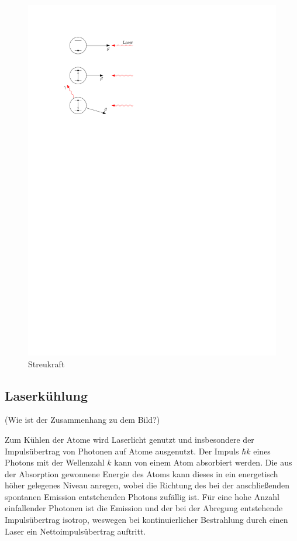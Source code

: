 \documentclass[11pt, a4paper]{article}
\numberwithin{equation}{section}
\newcommand{\korr}[1]{{\color{red}(#1)}}
\begin{document}
\begin{figure}
	\centering
	\includegraphics{./figures/theory/streukraft.pdf}
	\caption{Streukraft}
\end{figure}

\subsection{Laserkühlung}
\korr{Wie ist der Zusammenhang zu dem Bild?}

Zum Kühlen der Atome wird Laserlicht genutzt und insbesondere der Impulsübertrag von Photonen auf Atome ausgenutzt.
Der Impuls $\hbar k$ eines Photons mit der Wellenzahl $k$ kann von einem Atom absorbiert werden.
Die aus der Absorption gewonnene Energie des Atoms kann dieses in ein energetisch höher gelegenes Niveau anregen, wobei die Richtung des bei der anschließenden spontanen Emission entstehenden Photons zufällig ist.
Für eine hohe Anzahl einfallender Photonen ist die Emission und der bei der Abregung entstehende Impulsübertrag isotrop, weswegen bei kontinuierlicher Bestrahlung durch einen Laser ein Nettoimpulsübertrag auftritt.
\end{document}
